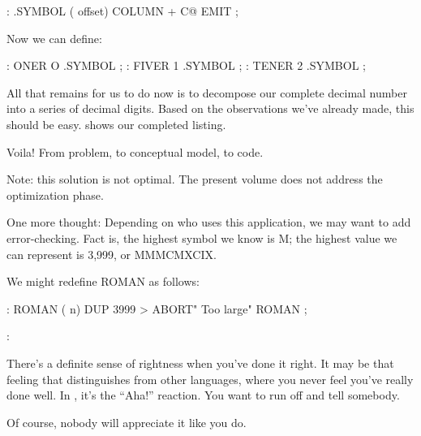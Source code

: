\begin{Code}
: .SYMBOL  ( offset)  COLUMN +  C@ EMIT ;
\end{Code}
Now we can define:

\begin{Code}
: ONER    O .SYMBOL ;
: FIVER   1 .SYMBOL ;
: TENER   2 .SYMBOL ;
\end{Code}
All that remains for us to do now is to decompose our complete decimal
number into a series of decimal digits. Based on the observations we've
already made, this should be easy.  shows our completed
listing.

Voila! From problem, to conceptual model, to code.

Note: this solution is not optimal. The present volume does not address
the optimization phase.

One more thought: Depending on who uses this application, we may
want to add error-checking. Fact is, the highest symbol we know is M; the
highest value we can represent is 3,999, or MMMCMXCIX.

\goodbreak
We might redefine ROMAN as follows:

\begin{Code}
: ROMAN  ( n)
   DUP  3999 >  ABORT" Too large"  ROMAN ;
\end{Code}

\begin{interview}
:

\begin{tfquot}
There's a definite sense of rightness when you've done it right. It may be
that feeling that distinguishes \Forth{} from other languages, where you
never feel you've really done well. In \Forth{}, it's the ``Aha!''
reaction. You want to run off and tell somebody.

Of course, nobody will appreciate it like you do.
\end{tfquot}
\end{interview}

